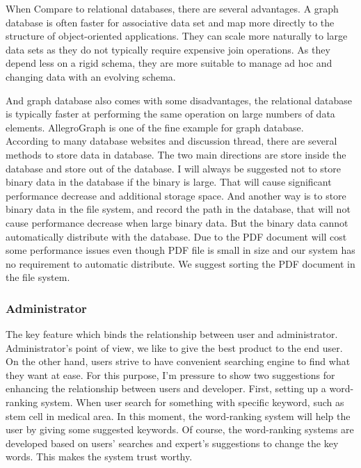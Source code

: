 When Compare to relational databases, there are several advantages. A graph database is often faster for associative data set and map more directly to the structure of object-oriented applications. They can scale more naturally to large data sets as they do not typically require expensive join operations. As they depend less on a rigid schema, they are more suitable to manage ad hoc and changing data with an evolving schema.

And graph database also comes with some disadvantages, the relational database is typically faster at performing the same operation on large numbers of data elements. AllegroGraph is one of the fine example for graph database. \\

According to many database websites and discussion thread, there are several methods to store data in database. The two main directions are store inside the database and store out of the database. I will always be suggested not to store binary data in the database if the binary is large. That will cause significant performance decrease and additional storage space. And another way is to store binary data in the file system, and record the path in the database, that will not cause performance decrease when large binary data. But the binary data cannot automatically distribute with the database. Due to the PDF document will cost some performance issues even though PDF file is small in size and our system has no requirement to automatic distribute. We suggest sorting the PDF document in the file system.

\subsubsection*{Administrator}
The key feature which binds the relationship between user and administrator. Administrator's point of view, we like to give the best product to the end user. On the other hand, users strive to have convenient searching engine to find what they want at ease. For this purpose, I'm pressure to show two suggestions for enhancing the relationship between users and developer. First, setting up a word-ranking system. When user search for something with specific keyword, such as stem cell in medical area. In this moment, the word-ranking system will help the user by giving some suggested keywords. Of course, the word-ranking systems are developed based on users' searches and expert's suggestions to change the key words. This makes the system trust worthy.
 
